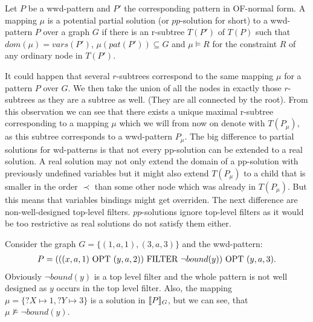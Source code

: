 \begin{definition}
	Let $P$ be a wwd-pattern and $P'$ the corresponding pattern in OF-normal
	form.
	A mapping $\mu$ is a potential partial solution (or $pp$-solution for short)
	to a wwd-pattern $P$ over a graph $G$ if there is an r-subtree $T(P')$ of
	$T(P)$ such that $dom(\mu) = vars(P')$, $\mu(pat(P')) \subseteq G$ and $\mu
	\models R$ for the constraint $R$ of any ordinary node in $T(P')$.
\end{definition}

It could happen that several $r$-subtrees correspond to the same mapping $\mu$
for a pattern $P$ over $G$. We then take the union of all the nodes in exactly
those $r$-subtrees as they are a subtree as well. (They are all connected by the root). 
From this observation we can see that there exists a unique maximal r-subtree
corresponding to a mapping $\mu$ which we will from now on denote with
$T(P_\mu)$, as this subtree corresponds to a wwd-pattern $P_\mu$. The
big difference to partial solutions for wd-patterns is that not every pp-solution can be
extended to a real solution. A real solution may not only extend the domain of a pp-solution
with previously undefined variables but it might also extend $T(P_\mu)$ to a
child that is smaller in the order $\prec$ than some other node which was
already in $T(P_\mu)$. But this means that variables bindings might get
overriden. The next difference are non-well-designed top-level filters.
$pp$-solutions ignore top-level filters as it would be too restrictive as real
solutions do not satisfy them either. 

\begin{example}
	Consider the graph $G = \{(1,a,1), (3,a,3)\}$ and the wwd-pattern:
	\begin{align*}
		P = (((x,a,1) \mbox{ OPT } (y,a,2)) \mbox{ FILTER } \neg bound(y)) \mbox{ OPT } (y,a,3).
	\end{align*}
	Obviously $\neg bound(y)$ is a top level filter and the whole pattern is
	not well designed as $y$ occurs in the top level filter.
	Also, the mapping $\mu = \{?X \mapsto 1, ?Y \mapsto 3\}$ is a solution in
	$\llbracket P \rrbracket_G$, but we can see, that $\mu \not\models \neg bound(y)$.
\end{example}

